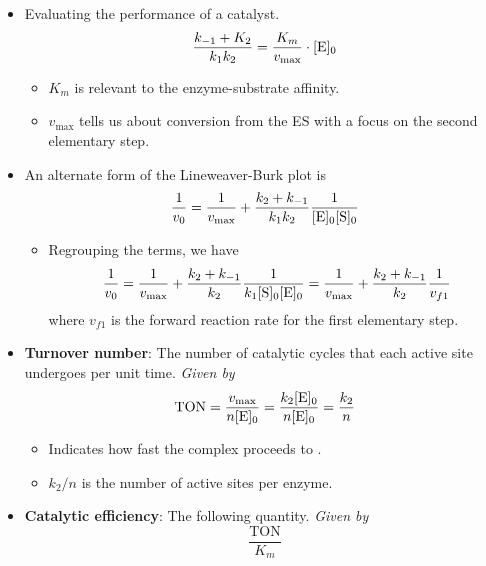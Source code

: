 \documentclass[../notes.tex]{subfiles}
\begin{document}
\begin{itemize}
\begin{itemize}
    \end{itemize}
    \item Evaluating the performance of a catalyst.
    \begin{equation*}
        \frac{k_{-1}+K_2}{k_1k_2} = \frac{K_m}{v_\text{max}}\cdot\cnc[0]{E}
    \end{equation*}
    \begin{itemize}
        \item $K_m$ is relevant to the enzyme-substrate affinity.
        \item $v_\text{max}$ tells us about conversion from the ES with a focus on the second elementary step.
    \end{itemize}
    \item An alternate form of the Lineweaver-Burk plot is
    \begin{equation*}
        \frac{1}{v_0} = \frac{1}{v_\text{max}}+\frac{k_2+k_{-1}}{k_1k_2}\frac{1}{\cnc[0]{E}\cnc[0]{S}}
    \end{equation*}
    \begin{itemize}
        \item Regrouping the terms, we have
        \begin{equation*}
            \frac{1}{v_0} = \frac{1}{v_\text{max}}+\frac{k_2+k_{-1}}{k_2}\frac{1}{k_1\cnc[0]{S}\cnc[0]{E}}
            = \frac{1}{v_\text{max}}+\frac{k_2+k_{-1}}{k_2}\frac{1}{v_{f1}}
        \end{equation*}
        where $v_{f1}$ is the forward reaction rate for the first elementary step.
    \end{itemize}
    \item \textbf{Turnover number}: The number of catalytic cycles that each active site undergoes per unit time. \emph{Given by}
    \begin{equation*}
        \text{TON} = \frac{v_\text{max}}{n\cnc[0]{E}}
        = \frac{k_2\cnc[0]{E}}{n\cnc[0]{E}}
        = \frac{k_2}{n}
    \end{equation*}
    \begin{itemize}
        \item Indicates how fast the  complex proceeds to .
        \item $k_2/n$ is the number of active sites per enzyme.
    \end{itemize}
    \item \textbf{Catalytic efficiency}: The following quantity. \emph{Given by}
    \begin{equation*}
        \frac{\text{TON}}{K_m}

\end{equation*}
\end{itemize}
\end{document}
